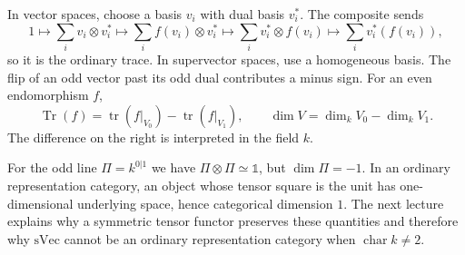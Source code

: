 In vector spaces, choose a basis $v_i$ with dual basis $v_i^*$. The composite sends
\[
 1\longmapsto\sum_i v_i\otimes v_i^*
 \longmapsto\sum_i f(v_i)\otimes v_i^*
 \longmapsto\sum_i v_i^*\otimes f(v_i)
 \longmapsto\sum_i v_i^*(f(v_i)),
\]
so it is the ordinary trace. In supervector spaces, use a homogeneous basis. The flip of an odd vector past its odd dual contributes a minus sign. For an even endomorphism $f$,
\[
 \operatorname{Tr}(f)=\operatorname{tr}(f|_{V_0})-\operatorname{tr}(f|_{V_1}),
 \qquad \dim V=\dim_kV_0-\dim_kV_1.
\]
The difference on the right is interpreted in the field $k$.

For the odd line $\Pi=k^{0|1}$ we have $\Pi\otimes\Pi\simeq\mathbb{1}$, but $\dim\Pi=-1$. In an ordinary representation category, an object whose tensor square is the unit has one-dimensional underlying space, hence categorical dimension $1$. The next lecture explains why a symmetric tensor functor preserves these quantities and therefore why $\mathrm{sVec}$ cannot be an ordinary representation category when $\operatorname{char}k\ne2$.
